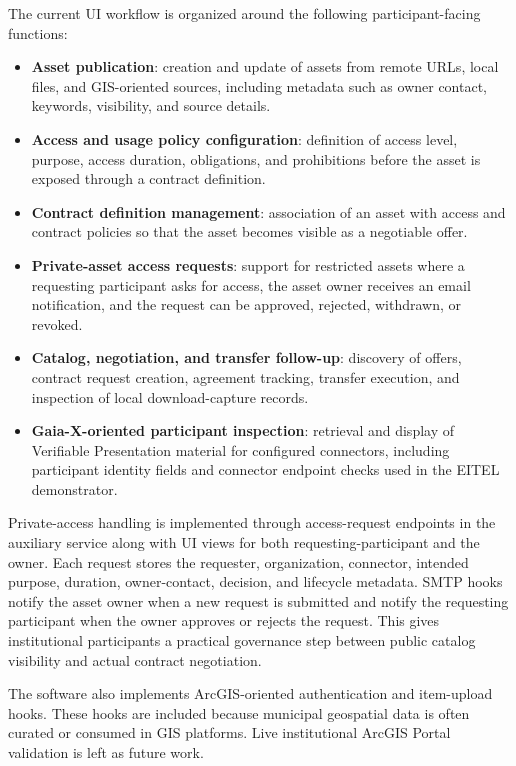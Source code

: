 \documentclass[a4paper,fleqn]{cas-dc}
\begin{document}
The current UI workflow is organized around the following participant-facing functions:

\begin{itemize}
\item \textbf{Asset publication}: creation and update of assets from remote URLs, local files, and GIS-oriented sources, including metadata such as owner contact, keywords, visibility, and source details.
\item \textbf{Access and usage policy configuration}: definition of access level, purpose, access duration, obligations, and prohibitions before the asset is exposed through a contract definition.
\item \textbf{Contract definition management}: association of an asset with access and contract policies so that the asset becomes visible as a negotiable offer.
\item \textbf{Private-asset access requests}: support for restricted assets where a requesting participant asks for access, the asset owner receives an email notification, and the request can be approved, rejected, withdrawn, or revoked.
\item \textbf{Catalog, negotiation, and transfer follow-up}: discovery of offers, contract request creation, agreement tracking, transfer execution, and inspection of local download-capture records.
\item \textbf{Gaia-X-oriented participant inspection}: retrieval and display of Verifiable Presentation material for configured connectors, including participant identity fields and connector endpoint checks used in the EITEL demonstrator.
\end{itemize}

Private-access handling is implemented through access-request endpoints in the auxiliary service along with UI views for both requesting-participant and the owner. Each request stores the requester, organization, connector, intended purpose, duration, owner-contact, decision, and lifecycle metadata. SMTP hooks notify the asset owner when a new request is submitted and notify the requesting participant when the owner approves or rejects the request. This gives institutional participants a practical governance step between public catalog visibility and actual contract negotiation.

The software also implements ArcGIS-oriented authentication and item-upload hooks. These hooks are included because municipal geospatial data is often curated or consumed in GIS platforms. Live institutional ArcGIS Portal validation is left as future work.
\end{document}
